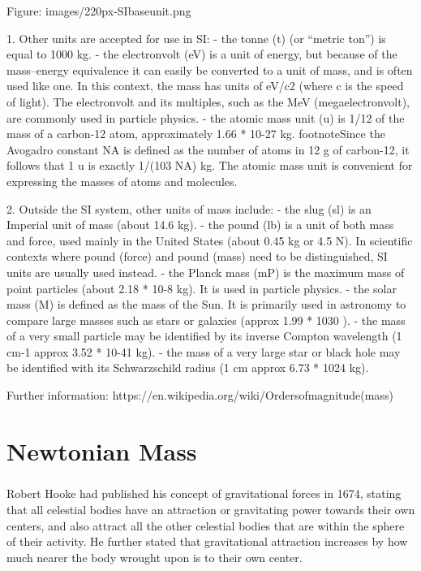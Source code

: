 \documentclass{book}
\begin{document}
	Figure: images/220px-SIbaseunit.png
	
	1. Other units are accepted for use in SI:
	- the tonne (t) (or ``metric ton'') is equal to 1000 kg.
	- the electronvolt (eV) is a unit of energy, but because of the mass–energy equivalence it can easily be converted to a unit of mass, and is often used like one. In this context, the mass has units of eV/c2 (where c is the speed of light). The electronvolt and its multiples, such as the MeV (megaelectronvolt), are commonly used in particle physics.
	- the atomic mass unit (u) is 1/12 of the mass of a carbon-12 atom, approximately 1.66 * 10{-27} kg. footnote{Since the Avogadro constant NA is defined as the number of atoms in 12 g of carbon-12, it follows that 1 u is exactly 1/(103 NA) kg.} The atomic mass unit is convenient for expressing the masses of atoms and molecules.        
	
	2. Outside the SI system, other units of mass include:
	- the slug (sl) is an Imperial unit of mass (about 14.6 kg).
	- the pound (lb) is a unit of both mass and force, used mainly in the United States (about 0.45 kg or 4.5 N). In scientific contexts where pound (force) and pound (mass) need to be distinguished, SI units are usually used instead.
	- the Planck mass (mP) is the maximum mass of point particles (about 2.18 * 10{-8} kg). It is used in particle physics.
	- the solar mass (M) is defined as the mass of the Sun. It is primarily used in astronomy to compare large masses such as stars or galaxies (approx 1.99 * 10{30} ).
	- the mass of a very small particle may be identified by its inverse Compton wavelength (1 cm{-1} approx 3.52 * 10{-41} kg).
	- the mass of a very large star or black hole may be identified with its Schwarzschild radius (1 cm approx 6.73 * 10{24} kg).
	
	Further information: https://en.wikipedia.org/wiki/Ordersofmagnitude(mass)
	
	\chapter{Newtonian Mass}
	\paragraph{}
	Robert Hooke had published his concept of gravitational forces in 1674, stating that all celestial bodies have an attraction or gravitating power towards their own centers, and also attract all the other celestial bodies that are within the sphere of their activity. He further stated that gravitational attraction increases by how much nearer the body wrought upon is to their own center.
	
\end{document}
